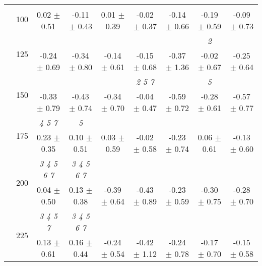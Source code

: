 \begin{table}[h]
{\begin{tabular}{
        ccccccccc}
 & \multirow{2}{*}{100}& & & & & & &  \\ 
 & & 0.02 $\pm$ 0.51& -0.11 $\pm$ 0.43& 0.01 $\pm$ 0.39& -0.02 $\pm$ 0.37& -0.14 $\pm$ 0.66& -0.19 $\pm$ 0.59& -0.09 $\pm$ 0.73 \\ 
 & \multirow{2}{*}{125}& \cellcolor[HTML]{EFEFEF} & \cellcolor[HTML]{EFEFEF} & \cellcolor[HTML]{EFEFEF} & \cellcolor[HTML]{EFEFEF} & \cellcolor[HTML]{EFEFEF} & \cellcolor[HTML]{EFEFEF} \textit{ 2 }& \cellcolor[HTML]{EFEFEF}  \\ 
 & & \cellcolor[HTML]{EFEFEF} -0.24 $\pm$ 0.69& \cellcolor[HTML]{EFEFEF} -0.34 $\pm$ 0.80& \cellcolor[HTML]{EFEFEF} -0.14 $\pm$ 0.61& \cellcolor[HTML]{EFEFEF} -0.15 $\pm$ 0.68& \cellcolor[HTML]{EFEFEF} -0.37 $\pm$ 1.36& \cellcolor[HTML]{EFEFEF} -0.02 $\pm$ 0.67& \cellcolor[HTML]{EFEFEF} -0.25 $\pm$ 0.64 \\ 
 & \multirow{2}{*}{150}& & & & \textit{ 2 5 7 }& & \textit{ 5 }&  \\ 
 & & -0.33 $\pm$ 0.79& -0.43 $\pm$ 0.74& -0.34 $\pm$ 0.70& -0.04 $\pm$ 0.47& -0.59 $\pm$ 0.72& -0.28 $\pm$ 0.61& -0.57 $\pm$ 0.77 \\ 
 & \multirow{2}{*}{175}& \cellcolor[HTML]{EFEFEF} \textit{ 4 5 7 }& \cellcolor[HTML]{EFEFEF} \textit{ 5 }& \cellcolor[HTML]{EFEFEF} & \cellcolor[HTML]{EFEFEF} & \cellcolor[HTML]{EFEFEF} & \cellcolor[HTML]{EFEFEF} & \cellcolor[HTML]{EFEFEF}  \\ 
 & & \cellcolor[HTML]{EFEFEF} 0.23 $\pm$ 0.35& \cellcolor[HTML]{EFEFEF} 0.10 $\pm$ 0.51& \cellcolor[HTML]{EFEFEF} 0.03 $\pm$ 0.59& \cellcolor[HTML]{EFEFEF} -0.02 $\pm$ 0.58& \cellcolor[HTML]{EFEFEF} -0.23 $\pm$ 0.74& \cellcolor[HTML]{EFEFEF} 0.06 $\pm$ 0.61& \cellcolor[HTML]{EFEFEF} -0.13 $\pm$ 0.60 \\ 
 & \multirow{2}{*}{200}& \textit{ 3 4 5 6 7 }& \textit{ 3 4 5 6 7 }& & & & &  \\ 
 & & 0.04 $\pm$ 0.50& 0.13 $\pm$ 0.38& -0.39 $\pm$ 0.64& -0.43 $\pm$ 0.89& -0.23 $\pm$ 0.59& -0.30 $\pm$ 0.75& -0.28 $\pm$ 0.70 \\ 
 & \multirow{2}{*}{225}& \cellcolor[HTML]{EFEFEF} \textit{ 3 4 5 7 }& \cellcolor[HTML]{EFEFEF} \textit{ 3 4 5 6 7 }& \cellcolor[HTML]{EFEFEF} & \cellcolor[HTML]{EFEFEF} & \cellcolor[HTML]{EFEFEF} & \cellcolor[HTML]{EFEFEF} & \cellcolor[HTML]{EFEFEF}  \\ 
 & & \cellcolor[HTML]{EFEFEF} 0.13 $\pm$ 0.61& \cellcolor[HTML]{EFEFEF} 0.16 $\pm$ 0.44& \cellcolor[HTML]{EFEFEF} -0.24 $\pm$ 0.54& \cellcolor[HTML]{EFEFEF} -0.42 $\pm$ 1.12& \cellcolor[HTML]{EFEFEF} -0.24 $\pm$ 0.78& \cellcolor[HTML]{EFEFEF} -0.17 $\pm$ 0.70& \cellcolor[HTML]{EFEFEF} -0.15 $\pm$ 0.58 \\ 

\end{tabular}}
\end{table}
